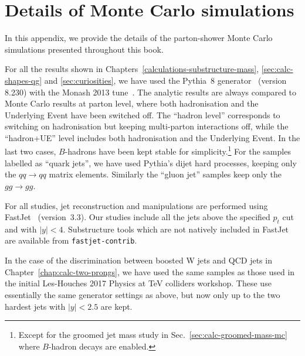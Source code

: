 \chapter{Details of Monte Carlo simulations}\label{chap:app-simulation-details}

In this appendix, we provide the details of the parton-shower Monte Carlo
simulations presented throughout this book.

For all the results shown in
Chapters~\ref{calculations-substructure-mass},
\ref{sec:calc-shapes-qg} and \ref{sec:curiosities}, we have used the
Pythia~8 generator~\cite{Sjostrand:2014zea,Sjostrand:2007gs} (version
8.230) with the Monash 2013 tune~\cite{Skands:2014pea}.
%
The analytic results are always compared to Monte Carlo results at
parton level, where both hadronisation and the Underlying Event have
been switched off.
%
The ``hadron level'' corresponds to switching on hadronisation but
keeping multi-parton interactions off, while the ``hadron+UE'' level
includes both hadronisation and the Underlying Event.
%
In the last two cases, $B$-hadrons have been kept stable for
simplicity.\footnote{Except for the groomed jet mass study in
  Sec.~\ref{sec:calc-groomed-mass-mc} where $B$-hadron decays are
  enabled.}
%
For the samples labelled as ``quark jets'', we have used Pythia's
dijet hard processes, keeping only the $qq\to qq$ matrix
elements. Similarly the ``gluon jet'' samples keep only the $gg\to gg$.

For all studies, jet reconstruction and manipulations are performed
using FastJet~\cite{Cacciari:2011ma,Cacciari:2005hq}
(version~3.3). Our studies include all the jets above the specified
$p_t$ cut and with $|y|<4$.
%
Substructure tools which are not natively included in FastJet are
available from {\tt {fastjet-contrib}}.

In the case of the discrimination between boosted W jets and QCD
jets in Chapter~\ref{chap:calc-two-prongs}, we have used the same
samples as those used in the initial Les-Houches 2017 Physics at TeV
colliders workshop.
%
These use essentially the same generator settings as above, but now
only up to the two hardest jets with $|y|<2.5$ are kept.



